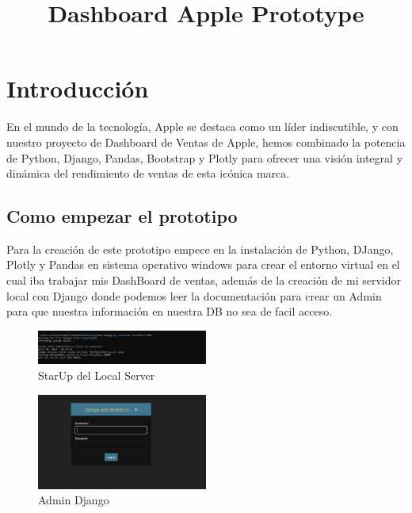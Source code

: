 \documentclass[conference]{IEEEtran}
\title{Dashboard Apple Prototype}
\author{\IEEEauthorblockN{Juan David Cotacio Sánchez}}
\begin{document}
\maketitle

\begin{abstract}

\end{abstract}

\section{Introducción}
En el mundo de la tecnología, Apple se destaca como un líder indiscutible, y con nuestro proyecto de Dashboard de Ventas de Apple, hemos combinado la potencia de Python, Django, Pandas, Bootstrap y Plotly para ofrecer una visión integral y dinámica del rendimiento de ventas de esta icónica marca.


\subsection{Como empezar el prototipo}

Para la creación de este prototipo empece en la instalación de Python, DJango, Plotly y Pandas en sistema operativo windows para crear el entorno virtual en el cual iba trabajar mis DashBoard de ventas, además de la creación de mi servidor local con Django donde podemos leer la documentación para crear un Admin para que nuestra información en nuestra DB no sea de facil acceso.
\begin{figure}[h] %
    \centering
    \includegraphics[width=0.5\textwidth]{images/StartUP.png} %
    \caption{StarUp del Local Server}
    \label{fig:mi_imagen}
\end{figure}

\begin{figure}[h] %
    \centering
    \includegraphics[width=0.5\textwidth]{images/admin.png} %
    \caption{Admin Django}
    \label{fig:mi_imagen}
\end{figure}
\end{document}
